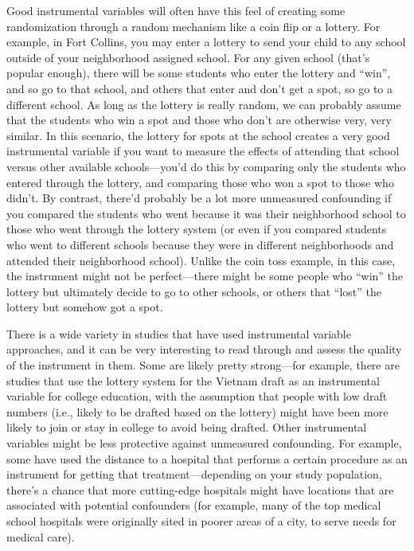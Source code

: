 \documentclass[
]{book}
\begin{document}
Good instrumental variables will often have this feel of creating some
randomization through a random mechanism like a coin flip or a lottery. For
example, in Fort Collins, you may enter a lottery to send your child to
any school outside of your neighborhood assigned school. For any given
school (that's popular enough), there will be some students who enter the
lottery and ``win'', and so go to that school, and others that enter and don't
get a spot, so go to a different school. As long as the lottery is really
random, we can probably assume that the students who win a spot and those who
don't are otherwise very, very similar. In this scenario, the lottery
for spots at the school creates a very good instrumental variable if you
want to measure the effects of attending that school versus other available
schools---you'd do this by comparing only the students who entered through
the lottery, and comparing those who won a spot to those who didn't. By contrast,
there'd probably be a lot more unmeasured confounding if you compared the
students who went because it was their neighborhood school to those who
went through the lottery system (or even if you compared students who went
to different schools because they were in different neighborhoods and
attended their neighborhood school). Unlike the coin toss example, in this
case, the instrument might not be perfect---there might be some people who
``win'' the lottery but ultimately decide to go to other schools, or others
that ``lost'' the lottery but somehow got a spot.

There is a wide variety in studies that have used instrumental
variable approaches, and it can be very interesting to read through and assess
the quality of the instrument in them. Some are likely pretty strong---for
example, there are studies that use the lottery system for the Vietnam draft
as an instrumental variable for college education, with the assumption that
people with low draft numbers (i.e., likely to be drafted based on the
lottery) might have been more likely to join or stay in college to avoid
being drafted. Other instrumental variables might be less protective against
unmeasured confounding. For example, some have used the distance to a hospital
that performs a certain procedure as an instrument for getting that
treatment---depending on your study population, there's a chance that more
cutting-edge hospitals might have locations that are associated with
potential confounders (for example, many of the top medical school hospitals
were originally sited in poorer areas of a city, to serve needs for
medical care).
\end{document}

